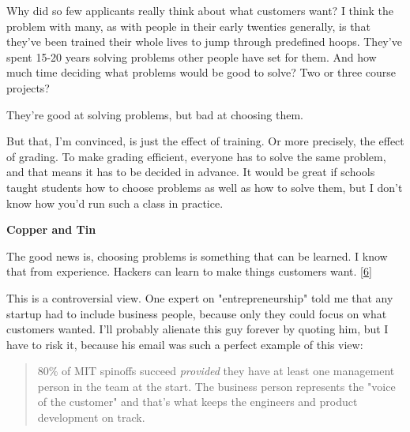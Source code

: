 Why did so few applicants
                    really think about what customers want? I think the problem
                    with many, as with people in their early twenties generally,
                    is that they've been trained their whole lives to jump
                    through predefined hoops. They've spent 15-20 years solving
                    problems other people have set for them. And how much time
                    deciding what problems would be good to solve? Two or three
                    course projects?
                    
                    They're good at solving problems, but bad at choosing
                    them.

But that, I'm convinced, is just the effect
                    of training. Or more precisely, the effect of grading. To
                    make grading efficient, everyone has to solve the same
                    problem, and that means it has to be decided in advance. It
                    would be great if schools taught students how to choose
                    problems as well as how to solve them, but I don't know how
                    you'd run such a class in practice.

\textbf{Copper and Tin}

The good news is, choosing problems is
                    something that can be learned. I know that from experience.
                    Hackers can learn to make things customers want.
                    [\href{\#f6n}{6}]

This is a controversial view. One expert on
                    "entrepreneurship" told me that any startup had to include
                    business people, because only they could focus on what
                    customers wanted. I'll probably alienate this guy forever by
                    quoting him, but I have to risk it, because his email was
                    such a perfect example of this view:
                  


                  \begin{quote}

                    80\% of MIT spinoffs succeed \emph{provided} they have at
                    least one management person in the team at the start. The
                    business person represents the "voice of the customer" and
                    that's what keeps the engineers and product development on
                    track.
                  
\end{quote}

